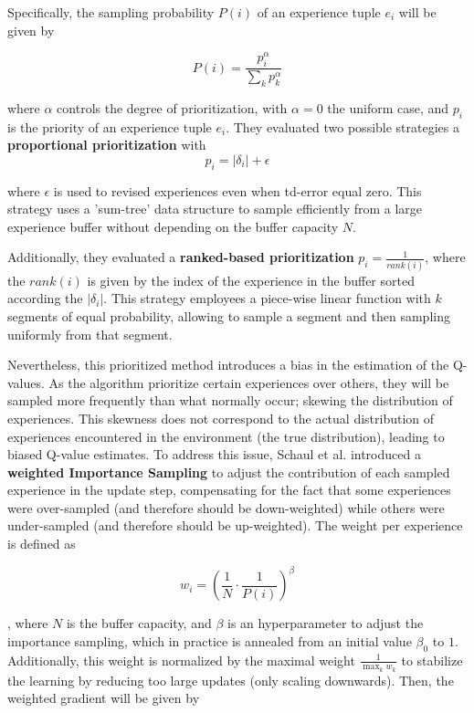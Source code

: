 Specifically, the sampling probability $P(i)$ of an experience tuple $e_i$ will be given by

\begin{equation}
    P(i) = \frac{p_i^\alpha}{\sum_k p_k^\alpha}
\end{equation}

where $\alpha$ controls the degree of prioritization, with $\alpha = 0$ the uniform case, and $p_i$ is the priority of an experience tuple $e_i$. They evaluated two possible strategies a \textbf{proportional prioritization} with 
\begin{equation}
    p_i = | \delta_i | + \epsilon
\end{equation}

where $\epsilon$ is used to revised experiences even when td-error equal zero. This strategy uses a 'sum-tree' data structure to sample efficiently from a large experience buffer without depending on the buffer capacity $N$.

Additionally, they evaluated a \textbf{ranked-based prioritization} $p_i = \frac{1}{rank(i)}$, where the $rank(i)$ is given by the index of the experience in the buffer sorted according the $| \delta_i |$. This strategy employees a piece-wise linear function with $k$ segments of equal probability, allowing to sample a segment and then sampling uniformly from that segment.

Nevertheless, this prioritized method introduces a bias in the estimation of the Q-values. As the algorithm prioritize certain experiences over others, they will be sampled more frequently than what normally occur; skewing the distribution of experiences. This skewness does not correspond to the actual distribution of experiences encountered in the environment (the true distribution), leading to biased Q-value estimates. To address this issue, Schaul et al. \cite{schaul2015prioritized} introduced a \textbf{weighted Importance Sampling} \cite{mahmood2014weighted} to adjust the contribution of each sampled experience in the update step, compensating for the fact that some experiences were over-sampled (and therefore should be down-weighted) while others were under-sampled (and therefore should be up-weighted). The weight per experience is defined as

\begin{equation}
    w_i = \left(\frac{1}{N} \cdot \frac{1}{P(i)} \right)^\beta
\end{equation}

, where $N$ is the buffer capacity, and $\beta$ is an hyperparameter to adjust the importance sampling, which in practice is annealed from an initial value $\beta_0$ to $1$. Additionally, this weight is normalized by the maximal weight $\frac{1}{\max_k w_k}$ to stabilize the learning by reducing too large updates (only scaling downwards). Then, the weighted gradient will be given by

